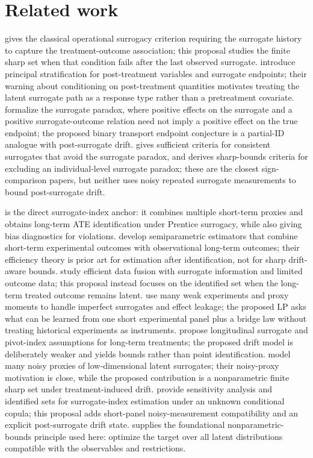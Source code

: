 \documentclass[11pt]{article}
\theoremstyle{definition}
\theoremstyle{plain}
\theoremstyle{remark}
\begin{document}
\section{Related work}
\citet{Prentice1989} gives the classical operational surrogacy criterion requiring the surrogate history to capture the treatment-outcome association; this proposal studies the finite sharp set when that condition fails after the last observed surrogate.  \citet{FrangakisRubin2002} introduce principal stratification for post-treatment variables and surrogate endpoints; their warning about conditioning on post-treatment quantities motivates treating the latent surrogate path as a response type rather than a pretreatment covariate.  \citet{ChenGengJia2007} formalize the surrogate paradox, where positive effects on the surrogate and a positive surrogate-outcome relation need not imply a positive effect on the true endpoint; the proposed binary transport endpoint conjecture is a partial-ID analogue with post-surrogate drift.  \citet{VanderWeele2013} gives sufficient criteria for consistent surrogates that avoid the surrogate paradox, and \citet{MaYinLiuGeng2021} derives sharp-bounds criteria for excluding an individual-level surrogate paradox; these are the closest sign-comparison papers, but neither uses noisy repeated surrogate measurements to bound post-surrogate drift.

\citet{AtheyChettyImbensKang2019} is the direct surrogate-index anchor: it combines multiple short-term proxies and obtains long-term ATE identification under Prentice surrogacy, while also giving bias diagnostics for violations.  \citet{ChenRitzwoller2023} develop semiparametric estimators that combine short-term experimental outcomes with observational long-term outcomes; their efficiency theory is prior art for estimation after identification, not for sharp drift-aware bounds.  \citet{LiLuedtke2023} study efficient data fusion with surrogate information and limited outcome data; this proposal instead focuses on the identified set when the long-term treated outcome remains latent.  \citet{BibautKallusEjdemyrZhao2023} use many weak experiments and proxy moments to handle imperfect surrogates and effect leakage; the proposed LP asks what can be learned from one short experimental panel plus a bridge law without treating historical experiments as instruments.  \citet{HuangWangYuanZhaoZhang2026} propose longitudinal surrogate and pivot-index assumptions for long-term treatments; the proposed drift model is deliberately weaker and yields bounds rather than point identification.  \citet{LalImbensHull2026} model many noisy proxies of low-dimensional latent surrogates; their noisy-proxy motivation is close, while the proposed contribution is a nonparametric finite sharp set under treatment-induced drift.  \citet{FanManzanaresParkQi2026} provide sensitivity analysis and identified sets for surrogate-index estimation under an unknown conditional copula; this proposal adds short-panel noisy-measurement compatibility and an explicit post-surrogate drift state.  \citet{Manski1990} supplies the foundational nonparametric-bounds principle used here: optimize the target over all latent distributions compatible with the observables and restrictions.
\end{document}
